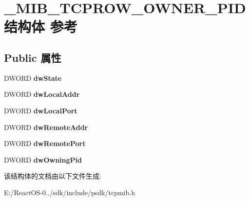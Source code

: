 \hypertarget{struct___m_i_b___t_c_p_r_o_w___o_w_n_e_r___p_i_d}{}\section{\+\_\+\+M\+I\+B\+\_\+\+T\+C\+P\+R\+O\+W\+\_\+\+O\+W\+N\+E\+R\+\_\+\+P\+I\+D结构体 参考}
\label{struct___m_i_b___t_c_p_r_o_w___o_w_n_e_r___p_i_d}
\subsection*{Public 属性}
\begin{DoxyCompactItemize}
\item 
\mbox{\label{struct___m_i_b___t_c_p_r_o_w___o_w_n_e_r___p_i_d_ac878a28c85b252dae37b6a376afd1829}} 
D\+W\+O\+RD {\bfseries dw\+State}
\item 
\mbox{\label{struct___m_i_b___t_c_p_r_o_w___o_w_n_e_r___p_i_d_a4d3ba3499416a8f43fbe4c2c3d221985}} 
D\+W\+O\+RD {\bfseries dw\+Local\+Addr}
\item 
\mbox{\label{struct___m_i_b___t_c_p_r_o_w___o_w_n_e_r___p_i_d_a3d42e0af4e9bba354bf04e51d78e5c15}} 
D\+W\+O\+RD {\bfseries dw\+Local\+Port}
\item 
\mbox{\label{struct___m_i_b___t_c_p_r_o_w___o_w_n_e_r___p_i_d_acc468d3c3dc918ec2685c2fc005380b1}} 
D\+W\+O\+RD {\bfseries dw\+Remote\+Addr}
\item 
\mbox{\label{struct___m_i_b___t_c_p_r_o_w___o_w_n_e_r___p_i_d_acd3c11dd9bbbf97146da9ad95bcce783}} 
D\+W\+O\+RD {\bfseries dw\+Remote\+Port}
\item 
\mbox{\label{struct___m_i_b___t_c_p_r_o_w___o_w_n_e_r___p_i_d_a570e309cceefc2476357b27f21e7440f}} 
D\+W\+O\+RD {\bfseries dw\+Owning\+Pid}
\end{DoxyCompactItemize}


该结构体的文档由以下文件生成\+:\begin{DoxyCompactItemize}
\item 
E\+:/\+React\+O\+S-\/0../sdk/include/psdk/tcpmib.\+h\end{DoxyCompactItemize}
